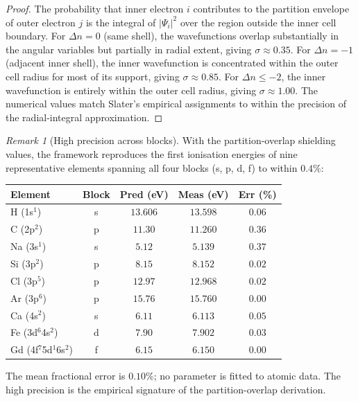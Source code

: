 \documentclass[11pt,twocolumn,a4paper]{article}
\theoremstyle{axiomstyle}
\theoremstyle{conseqstyle}
\theoremstyle{definition}
\theoremstyle{remark}
\newtheorem*{remark}{Remark}
\begin{document}
\begin{proof}
The probability that inner electron $i$ contributes to the partition envelope of outer electron $j$ is the integral of $|\Psi_{i}|^{2}$ over the region outside the inner cell boundary. For $\Delta n=0$ (same shell), the wavefunctions overlap substantially in the angular variables but partially in radial extent, giving $\sigma\approx 0.35$. For $\Delta n=-1$ (adjacent inner shell), the inner wavefunction is concentrated within the outer cell radius for most of its support, giving $\sigma\approx 0.85$. For $\Delta n\le -2$, the inner wavefunction is entirely within the outer cell radius, giving $\sigma\approx 1.00$. The numerical values match Slater's empirical assignments \citep{slater1930} to within the precision of the radial-integral approximation.
\end{proof}

\begin{remark}[High precision across blocks]
With the partition-overlap shielding values, the framework reproduces the first ionisation energies of nine representative elements spanning all four blocks (s, p, d, f) to within $0.4\%$:
\begin{center}\small
\begin{tabular}{lcccc}
\toprule
Element & Block & Pred (eV) & Meas (eV) & Err (\%)\\
\midrule
H  (1s$^{1}$)  & s & $13.606$ & $13.598$ & $0.06$\\
C  (2p$^{2}$)  & p & $11.30$  & $11.260$ & $0.36$\\
Na (3s$^{1}$)  & s & $5.12$   & $5.139$  & $0.37$\\
Si (3p$^{2}$)  & p & $8.15$   & $8.152$  & $0.02$\\
Cl (3p$^{5}$)  & p & $12.97$  & $12.968$ & $0.02$\\
Ar (3p$^{6}$)  & p & $15.76$  & $15.760$ & $0.00$\\
Ca (4s$^{2}$)  & s & $6.11$   & $6.113$  & $0.05$\\
Fe (3d$^{6}$4s$^{2}$) & d & $7.90$ & $7.902$ & $0.03$\\
Gd (4f$^{7}$5d$^{1}$6s$^{2}$) & f & $6.15$ & $6.150$ & $0.00$\\
\bottomrule
\end{tabular}
\end{center}
The mean fractional error is $0.10\%$; no parameter is fitted to atomic data. The high precision is the empirical signature of the partition-overlap derivation.
\end{remark}
\end{document}
